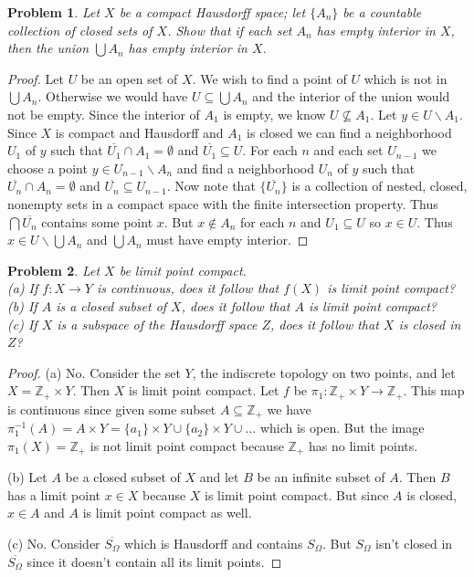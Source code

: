 \documentclass{article}
\newtheorem{problem}{Problem}
\begin{document}
\begin{problem}
Let $X$ be a compact Hausdorff space; let $\{A_n\}$ be a countable collection of closed sets of $X$. Show that if each set $A_n$ has empty interior in $X$, then the union $\bigcup A_n$ has empty interior in $X$.
\end{problem}
\begin{proof}
Let $U$ be an open set of $X$. We wish to find a point of $U$ which is not in $\bigcup A_n$. Otherwise we would have $U \subseteq \bigcup A_n$ and the interior of the union would not be empty. Since the interior of $A_1$ is empty, we know $U \nsubseteq A_1$. Let $y \in U \backslash A_1$. Since $X$ is compact and Hausdorff and $A_1$ is closed we can find a neighborhood $U_1$ of $y$ such that $\overline{U_1} \cap A_1 = \emptyset$ and $\overline{U_1} \subseteq U$. For each $n$ and each set $U_{n-1}$ we choose a point $y \in U_{n-1} \backslash A_n$ and find a neighborhood $U_n$ of $y$ such that $\overline{U_n} \cap A_n = \emptyset$ and $\overline{U_n} \subseteq U_{n-1}$. Now note that $\{\overline{U_n}\}$ is a collection of nested, closed, nonempty sets in a compact space with the finite intersection property. Thus $\bigcap \overline{U_n}$ contains some point $x$. But $x \notin A_n$ for each $n$ and $U_1 \subseteq U$ so $x \in U$. Thus $x \in U \backslash \bigcup A_n$ and $\bigcup A_n$ must have empty interior.
\end{proof}

\begin{problem}
Let $X$ be limit point compact.\\
(a) If $f : X \to Y$ is continuous, does it follow that $f(X)$ is limit point compact?\\
(b) If $A$ is a closed subset of $X$, does it follow that $A$ is limit point compact?\\
(c) If $X$ is a subspace of the Hausdorff space $Z$, does it follow that $X$ is closed in $Z$?
\end{problem}
\begin{proof}
(a) No. Consider the set $Y$, the indiscrete topology on two points, and let $X = \mathbb{Z}_+ \times Y$. Then $X$ is limit point compact. Let $f$ be $\pi_1 : \mathbb{Z}_+ \times Y \to \mathbb{Z}_+$. This map is continuous since given some subset $A \subseteq \mathbb{Z}_+$ we have $\pi_1^{-1}(A) = A \times Y = \{a_1\} \times Y \cup \{a_2\} \times Y \cup \dots$ which is open. But the image $\pi_1(X) = \mathbb{Z}_+$ is not limit point compact because $\mathbb{Z}_+$ has no limit points.

(b) Let $A$ be a closed subset of $X$ and let $B$ be an infinite subset of $A$. Then $B$ has a limit point $x \in X$ because $X$ is limit point compact. But since $A$ is closed, $x \in A$ and $A$ is limit point compact as well.

(c) No. Consider $\overline{S_{\Omega}}$ which is Hausdorff and contains $S_{\Omega}$. But $S_{\Omega}$ isn't closed in $\overline{S_{\Omega}}$ since it doesn't contain all its limit points.
\end{proof}
\end{document}

